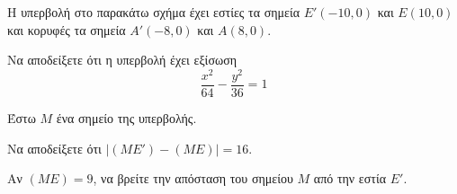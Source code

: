 Η υπερβολή στο παρακάτω σχήμα έχει εστίες τα σημεία $E'(-10,0)$ και $E(10,0)$ και κορυφές τα σημεία $A'(-8,0)$ και $A(8,0)$.
\begin{alist}
    \item Να αποδείξετε ότι η υπερβολή έχει εξίσωση
    \[ \frac{x^2}{64} - \frac{y^2}{36} = 1 \] 
    \item Έστω $M$ ένα σημείο της υπερβολής.
    \begin{rlist}
        \item Να αποδείξετε ότι $|(ME') - (ME)| = 16$. 
        \item Αν $(ME) = 9$, να βρείτε την απόσταση του σημείου $M$ από την εστία $E'$. 
    \end{rlist}
\end{alist}